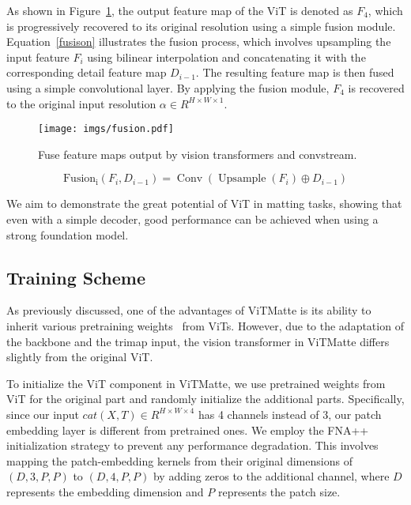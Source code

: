 \documentclass[10pt,twocolumn,letterpaper]{article}
\newcommand{\thename}{ViTMatte}
\begin{document}
As shown in Figure~\ref{fig:fusion}, the output feature map of the ViT is denoted as $F_4$, which is progressively recovered to its original resolution using a simple fusion module. Equation~\eqref{fusison} illustrates the fusion process, which involves upsampling the input feature $F_i$ using bilinear interpolation and concatenating it with the corresponding detail feature map $D_{i-1}$. The resulting feature map is then fused using a simple convolutional layer. By applying the fusion module, $F_4$ is recovered to the original input resolution $\alpha\in R^{H\times W\times 1}$.

\begin{figure}[tbp]
    \centering
    \texttt{[image: imgs/fusion.pdf]}
    \caption{Fuse feature maps output by vision transformers and convstream.}
    \label{fig:fusion}
\end{figure}

\begin{equation}
\label{fusison}
\operatorname{Fusion_i}(F_i, D_{i-1})=\operatorname{Conv}(\operatorname{Upsample}(F_i)\oplus D_{i-1})
\end{equation}

We aim to demonstrate the great potential of ViT in matting tasks, showing that even with a simple decoder, good performance can be achieved when using a strong foundation model. 

\subsection{Training Scheme}
\label{training}

As previously discussed, one of the advantages of \thename{} is its ability to inherit various pretraining weights~\cite{dino, ibot, he2022masked} from ViTs. However, due to the adaptation of the backbone and the trimap input, the vision transformer in \thename{} differs slightly from the original ViT.

To initialize the ViT component in \thename{}, we use pretrained weights from ViT for the original part and randomly initialize the additional parts. Specifically, since our input $cat(X, T)\in R^{H\times W\times 4}$ has 4 channels instead of 3, our patch embedding layer is different from pretrained ones. We employ the FNA++~\cite{fna++} initialization strategy to prevent any performance degradation. This involves mapping the patch-embedding kernels from their original dimensions of $(D, 3, P, P)$ to $(D, 4, P, P)$ by adding zeros to the additional channel, where $D$ represents the embedding dimension and $P$ represents the patch size.
\end{document}
